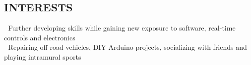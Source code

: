 \documentclass[mm]{res}
\newcommand{\tb}{\textbullet \xspace}
\begin{document}
\begin{resume}
\section{INTERESTS \xspace}
􏰚\tb Further developing skills while gaining new exposure to software, real-time controls and electronics \\
􏰚\tb Repairing off road vehicles, DIY Arduino projects, socializing with friends and playing intramural sports

\end{resume}
\end{document}
